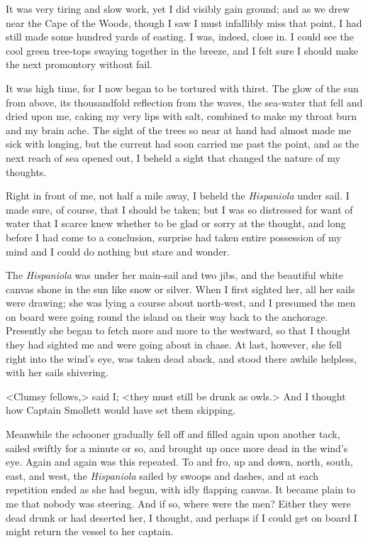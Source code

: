 It was very tiring and slow work, yet I did visibly gain ground; and as we drew near the Cape of the Woods, though I saw I must infallibly miss that point, I had still made some hundred yards of easting. I was, indeed, close in. I could see the cool green tree-tops swaying together in the breeze, and I felt sure I should make the next promontory without fail.

It was high time, for I now began to be tortured with thirst. The glow of the sun from above, its thousandfold reflection from the waves, the sea-water that fell and dried upon me, caking my very lips with salt, combined to make my throat burn and my brain ache. The sight of the trees so near at hand had almost made me sick with longing, but the current had soon carried me past the point, and as the next reach of sea opened out, I beheld a sight that changed the nature of my thoughts.

Right in front of me, not half a mile away, I beheld the \textit{Hispaniola} under sail. I made sure, of course, that I should be taken; but I was so distressed for want of water that I scarce knew whether to be glad or sorry at the thought, and long before I had come to a conclusion, surprise had taken entire possession of my mind and I could do nothing but stare and wonder.

The \textit{Hispaniola} was under her main-sail and two jibs, and the beautiful white canvas shone in the sun like snow or silver. When I first sighted her, all her sails were drawing; she was lying a course about north-west, and I presumed the men on board were going round the island on their way back to the anchorage. Presently she began to fetch more and more to the westward, so that I thought they had sighted me and were going about in chase. At last, however, she fell right into the wind's eye, was taken dead aback, and stood there awhile helpless, with her sails shivering.

<Clumsy fellows,> said I; <they must still be drunk as owls.> And I thought how Captain Smollett would have set them skipping.

Meanwhile the schooner gradually fell off and filled again upon another tack, sailed swiftly for a minute or so, and brought up once more dead in the wind's eye. Again and again was this repeated. To and fro, up and down, north, south, east, and west, the \textit{Hispaniola} sailed by swoops and dashes, and at each repetition ended as she had begun, with idly flapping canvas. It became plain to me that nobody was steering. And if so, where were the men? Either they were dead drunk or had deserted her, I thought, and perhaps if I could get on board I might return the vessel to her captain.


